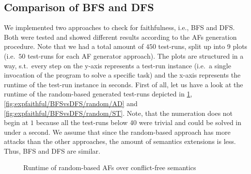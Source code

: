 \subsection{Comparison of BFS and DFS}
\label{subsec:faithfulComparisonBFSvsDFS}

\newcommand{\plotWidth}{10cm}
\newcommand{\plotHeight}{8cm}
\newcommand{\plotHeightSmall}{5cm}


We implemented two approaches to check for faithfulness, i.e., BFS and DFS. Both were tested and showed different results according to the AFs generation procedure. Note that we had a total amount of $450$ test-runs, split up into 9 plots (i.e.\ $50$ test-runs for each AF generator approach). The plots are structured in a way, s.t.\ every step on the y-axis represents a test-run instance (i.e.\ a single invocation of the program to solve a specific task) and the x-axis represents the runtime of the test-run instance in seconds. First of all, let us have a look at the runtime of the random-based generated test-runs depicted in \cref{fig:expfaithful/BFSvsDFS/random/CF}, \cref{fig:expfaithful/BFSvsDFS/random/AD} and \cref{fig:expfaithful/BFSvsDFS/random/ST}.
Note, that the numeration does not begin at $1$ because all the test-runs below 40 were trivial and could be solved in under a second. We assume that since the random-based approach has more attacks than the other approaches, the amount of semantics extensions is less. Thus, BFS and DFS are similar.




\begin{figure}[H]
    \centering
    \caption{Runtime of random-based AFs over conflict-free semantics}
    \label{fig:expfaithful/BFSvsDFS/random/CF}
\end{figure}


